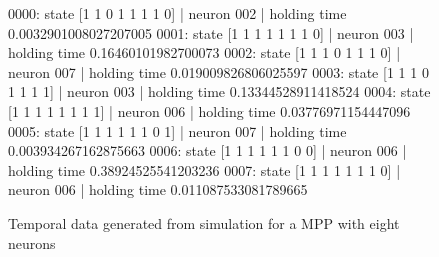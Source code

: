 \begin{figure}[h]
\centering
\begin{python}
0000: state [1 1 0 1 1 1 1 0] | neuron 002 | holding time 0.0032901008027207005
0001: state [1 1 1 1 1 1 1 0] | neuron 003 | holding time 0.16460101982700073
0002: state [1 1 1 0 1 1 1 0] | neuron 007 | holding time 0.019009826806025597
0003: state [1 1 1 0 1 1 1 1] | neuron 003 | holding time 0.13344528911418524
0004: state [1 1 1 1 1 1 1 1] | neuron 006 | holding time 0.03776971154447096
0005: state [1 1 1 1 1 1 0 1] | neuron 007 | holding time 0.003934267162875663
0006: state [1 1 1 1 1 1 0 0] | neuron 006 | holding time 0.38924525541203236
0007: state [1 1 1 1 1 1 1 0] | neuron 006 | holding time 0.011087533081789665
\end{python}

\caption{Temporal data generated from simulation for a MPP with eight neurons}
\label{fig:simulateddata}
\end{figure}





